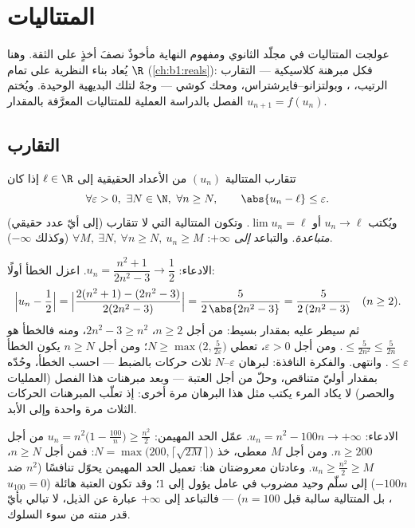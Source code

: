 \chapter{المتتاليات}\label{ch:b1:seq}

عولجت المتتاليات في مجلّد الثانوي ومفهوم النهاية
مأخوذٌ نصفَ أخذٍ على الثقة. وهنا يُعاد بناء النظرية على
تمام $\R$ (\cref{ch:b1:reals}): فكل مبرهنة كلاسيكية
--- التقارب الرتيب، ، وبولتزانو--فايرشتراس،
ومحك كوشي --- وجهٌ لتلك البديهية الوحيدة. ويُختم الفصل
بالدراسة العملية للمتتاليات المعرَّفة بالمقدار $u_{n+1} =
f(u_n)$.

\section{التقارب}

\begin{definition}\label{def:b1:seq:limit}
تتقارب المتتالية $(u_n)$ من الأعداد الحقيقية إلى $\ell \in \R$
إذا كان
\[
\forall \varepsilon > 0,\ \exists N \in \N,\ \forall n \geq N,
\qquad \abs{u_n - \ell} \leq \varepsilon .
\]
ويُكتب $u_n \to \ell$ أو $\lim u_n = \ell$. وتكون المتتالية التي لا
تتقارب (إلى أيّ عدد حقيقي) \emph{متباعدة}. والتباعد \emph{إلى
$+\infty$}: $\forall M,\ \exists N,\ \forall n \geq N,\ u_n \geq M$
(وكذلك $-\infty$).
\end{definition}

\begin{example}\label{ex:b1:seq:epsilonN}
الادعاء: $u_n = \dfrac{n^2 + 1}{2n^2 - 3} \to \dfrac12$. اعزل
الخطأ أولًا:
\[
\Bigl| u_n - \frac12 \Bigr|
= \Bigl| \frac{2(n^2 + 1) - (2n^2 - 3)}{2(2n^2 - 3)} \Bigr|
= \frac{5}{2\,\abs{2n^2 - 3}}
= \frac{5}{2\,(2n^2 - 3)} \quad (n \geq 2).
\]
ثم سيطر عليه بمقدار بسيط: من أجل $n \geq 2$، $2n^2 - 3
\geq n^2$، ومنه فالخطأ هو $\leq \frac{5}{2n^2} \leq \frac 5{2n}$.
ومن أجل $\varepsilon > 0$، تعطي  $N \geq
\max\bigl(2, \frac{5}{2\varepsilon}\bigr)$؛ ومن أجل $n \geq N$ يكون
الخطأ $\leq \varepsilon$. وانتهى. والفكرة النافذة: لبرهان
$\varepsilon$--$N$ ثلاث حركات بالضبط --- احسب
الخطأ، وحُدّه بمقدار أوليّ متناقص، وحلّ من أجل
العتبة --- وبعد مبرهنات هذا الفصل (العمليات
والحصر) لا يكاد المرء يكتب مثل هذا البرهان مرة أخرى: إذ تعلّب
المبرهنات الحركات الثلاث مرة واحدة وإلى الأبد.
\end{example}

\begin{example}\label{ex:b1:seq:toinfinity}
الادعاء: $u_n = n^2 - 100n \to +\infty$. عمّل الحد المهيمن:
$u_n = n^2\bigl(1 - \frac{100}{n}\bigr) \geq \frac{n^2}{2}$ من أجل
$n \geq 200$. ومن أجل $M$ معطى، خذ $N = \max\bigl(200,
\lceil\sqrt{2M}\rceil\bigr)$: فمن أجل $n \geq N$، $u_n \geq
\frac{n^2}{2} \geq M$. وعادتان معروضتان هنا: تعميل الحد
المهيمن يحوّل تنافسًا ($n^2$ ضد $-100n$) إلى
سلّم وحيد مضروب في عامل يؤول إلى $1$؛ وقد تكون العتبة
هائلة ($u_{100} = 0$، بل المتتالية سالبة قبل
$n = 100$) --- فالتباعد إلى $+\infty$ عبارة عن الذيل،
لا تبالي بأيّ قدر منته من سوء السلوك.
\end{example}

